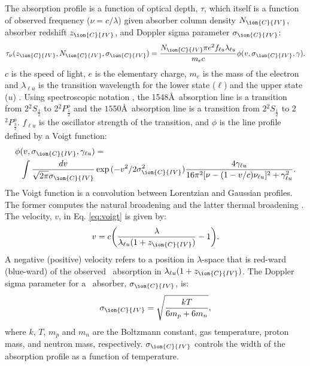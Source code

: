 \documentclass[fleqn,usenatbib]{mnras}
\newcommand{\civ}{\ion{C}{IV}}
\newcommand{\nciv}{N_{\civ}} %
\newcommand{\zciv}{z_{\civ}}
\newcommand{\sciv}{\sigma_{\civ}}
\begin{document}
The absorption profile is a function of optical depth, $\tau$, which itself is a function of
observed frequency ($\nu = c/\lambda$) given absorber column
 density $N_{\civ}$, absorber redshift $\zciv$, and  Doppler sigma parameter  $\sciv$:
\begin{equation}
\tau_{\nu}(\zciv, \nciv, \sciv)
=  \frac{\nciv\pi e^2 f_{\ell u} \lambda_{\ell u}}{m_e c}
\phi(v, \sciv, \gamma).
\label{eq:optDepth}
\end{equation}
$c$ is the speed of light, $e$ is the elementary charge, $m_e$ is the mass of the electron and
$\lambda_{\ell u}$ is the transition wavelength for the lower state ($\ell$) and the upper state ($u$) . Using spectroscopic notation \citep{specBook}, the 1548\AA\ absorption
 line is a transition from
2${^2}{S}_{\frac{1}{2}}$ to 2${^2}{P}_{\frac{1}{2}}^{o}$  and the $1550$\AA\ absorption line is
a transition from 2${^2}{S}_{\frac{1}{2}}$ to 2${^2}{P}_{\frac{3}{2}}^{o}$. $f_{\ell u}$ is the oscillator strength of the transition, and
$\phi$ is the line profile defined by a Voigt function:
\begin{equation}
\begin{split}
    \phi(v, \sciv, \gamma_{\ell u})
    &=\\
    \int \frac{d v}{\sqrt{2\pi}\sciv} &\exp{(-v^2 / 2\sciv^2)}
    \frac{4 \gamma_{\ell u}}{16 \pi^2 [ \nu - (1 - v/c)\nu_{\ell u} ]^2 + \gamma_{\ell u}^2}.
\end{split}
\label{eq:voigt}
\end{equation}
The Voigt function is a convolution between Lorentzian and Gaussian profiles.
The former computes the natural broadening and the latter thermal
broadening \citep{DrainBook}. The velocity, $v$, in Eq. \ref{eq:voigt} is
given by:
  \begin{equation}
    v = c\bigg(\frac{\lambda}{\lambda_{\ell u}(1+\zciv)} -1\bigg).
  \end{equation}
  A negative (positive) velocity refers to a position in $\lambda$-space that is red-ward (blue-ward) of the observed \civ\ absorption in $\lambda_{\ell u}(1+\zciv)$.
  The Doppler sigma parameter for a \civ\ absorber, $\sciv$, is:
\begin{equation}
  \sciv = \sqrt{\frac{kT}{6m_p+6m_n}},
  \label{eq:sigma}
\end{equation}
  where $k$, $T$, $m_p$ and $m_n$  are the Boltzmann constant, gas temperature,
  proton mass, and neutron mass, respectively. $\sciv$ controls the
  width of the absorption profile as a function of temperature.
\end{document}
